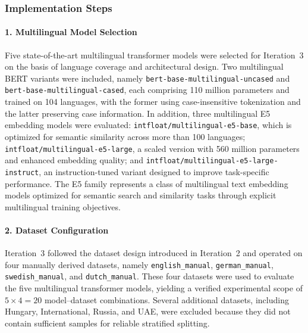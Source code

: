 \documentclass[11pt, titlepage, bibliography=totoc]{scrreprt}
\begin{document}
\subsubsection{Implementation Steps}

\paragraph{1. Multilingual Model Selection}
Five state-of-the-art multilingual transformer models were selected for Iteration~3 on the basis of language coverage and architectural design. Two multilingual BERT variants were included, namely \texttt{bert-base-multilingual-uncased} and \texttt{bert-base-multilingual-cased}, each comprising 110 million parameters and trained on 104 languages, with the former using case-insensitive tokenization and the latter preserving case information. In addition, three multilingual E5 embedding models were evaluated: \texttt{intfloat/multilingual-e5-base}, which is optimized for semantic similarity across more than 100 languages; \texttt{intfloat/multilingual-e5-large}, a scaled version with 560 million parameters and enhanced embedding quality; and \texttt{intfloat/multilingual-e5-large-instruct}, an instruction-tuned variant designed to improve task-specific performance. The E5 family represents a class of multilingual text embedding models optimized for semantic search and similarity tasks through explicit multilingual training objectives.

\paragraph{2. Dataset Configuration}
Iteration~3 followed the dataset design introduced in Iteration~2 and operated on four manually derived datasets, namely \texttt{english\_manual}, \texttt{german\_manual}, \texttt{swedish\_manual}, and \texttt{dutch\_manual}. These four datasets were used to evaluate the five multilingual transformer models, yielding a verified experimental scope of \(5 \times 4 = 20\) model--dataset combinations. Several additional datasets, including Hungary, International, Russia, and UAE, were excluded because they did not contain sufficient samples for reliable stratified splitting.
\end{document}
